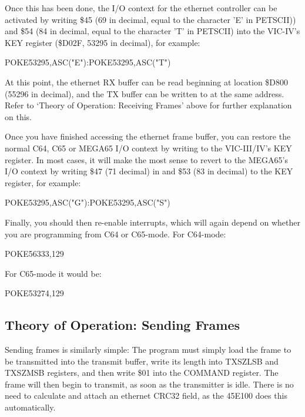 Once this has been done, the I/O context for the ethernet controller can be activated by writing \$45 (69 in decimal, equal to the character 'E' in PETSCII)) and \$54 (84 in decimal, equal to the character 'T' in PETSCII) into the VIC-IV's KEY register (\$D02F, 53295 in decimal), for example:

\begin{screencode}
POKE53295,ASC("E"):POKE53295,ASC("T")
\end{screencode}

At this point, the ethernet RX buffer can be read beginning at location \$D800 (55296 in decimal), and the TX buffer can be written to at the same address.  Refer to `Theory of Operation: Receiving Frames' above for further explanation on this.

Once you have finished accessing the ethernet frame buffer, you can restore the normal C64, C65 or MEGA65 I/O context by writing to the VIC-III/IV's KEY register.  In most cases, it will make the most sense to revert to the MEGA65's I/O context by writing \$47 (71 decimal) in and \$53 (83 in decimal) to the KEY register, for example:

\begin{screencode}
POKE53295,ASC("G"):POKE53295,ASC("S")
\end{screencode}

Finally, you should then re-enable interrupts, which will again depend on whether you are programming from C64 or C65-mode.  For C64-mode:

\begin{screencode}
POKE56333,129
\end{screencode}

For C65-mode it would be:

\begin{screencode}
POKE53274,129
\end{screencode}



\subsection{Theory of Operation: Sending Frames}

Sending frames is similarly simple: The program must simply load the frame to be transmitted into
the transmit buffer, write its length into TXSZLSB and TXSZMSB registers, and then write \$01 into
the COMMAND register.  The frame will then begin to transmit, as soon as the transmitter is idle.
There is no need to calculate and attach an ethernet CRC32 field, as the 45E100 does this automatically.

